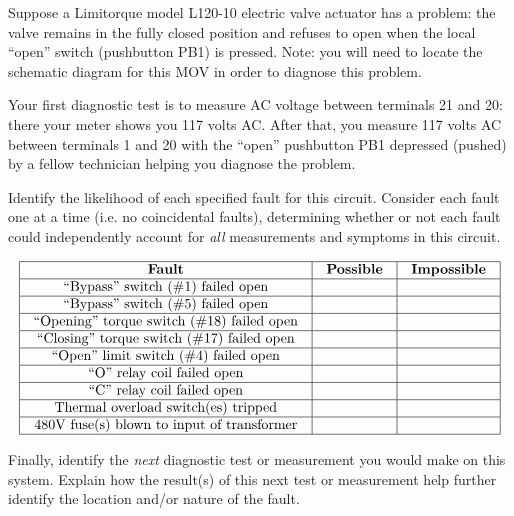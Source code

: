 

Suppose a Limitorque model L120-10 electric valve actuator has a problem: the valve remains in the fully closed position and refuses to open when the local ``open'' switch (pushbutton PB1) is pressed.  Note: you will need to locate the schematic diagram for this MOV in order to diagnose this problem.

Your first diagnostic test is to measure AC voltage between terminals 21 and 20: there your meter shows you 117 volts AC.  After that, you measure 117 volts AC between terminals 1 and 20 with the ``open'' pushbutton PB1 depressed (pushed) by a fellow technician helping you diagnose the problem.

Identify the likelihood of each specified fault for this circuit.  Consider each fault one at a time (i.e. no coincidental faults), determining whether or not each fault could independently account for {\it all} measurements and symptoms in this circuit.


$$\vbox{\offinterlineskip
\halign{\strut
\vrule \quad\hfil # \ \hfil & 
\vrule \quad\hfil # \ \hfil & 
\vrule \quad\hfil # \ \hfil \vrule \cr
\noalign{\hrule}
%
{\bf Fault} & {\bf Possible} & {\bf Impossible} \cr
%
\noalign{\hrule}
%
``Bypass'' switch (\#1) failed open &  &  \cr
%
\noalign{\hrule}
%
``Bypass'' switch (\#5) failed open &  &  \cr
%
\noalign{\hrule}
%
``Opening'' torque switch (\#18) failed open &  &  \cr
%
\noalign{\hrule}
%
``Closing'' torque switch (\#17) failed open &  &  \cr
%
\noalign{\hrule}
%
``Open'' limit switch (\#4) failed open &  &  \cr
%
\noalign{\hrule}
%
``O'' relay coil failed open &  &  \cr
%
\noalign{\hrule}
%
``C'' relay coil failed open &  &  \cr
%
\noalign{\hrule}
%
Thermal overload switch(es) tripped &  &  \cr
%
\noalign{\hrule}
%
480V fuse(s) blown to input of transformer &  &  \cr
%
\noalign{\hrule}
} %
}$$ %

Finally, identify the {\it next} diagnostic test or measurement you would make on this system.  Explain how the result(s) of this next test or measurement help further identify the location and/or nature of the fault.

